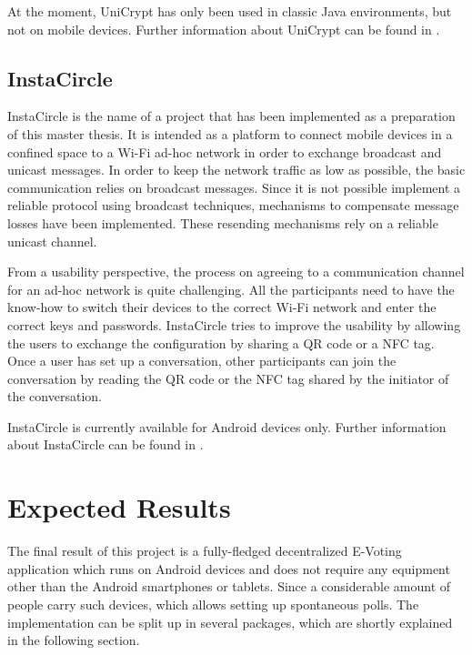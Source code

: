\documentclass[numbers=noenddot, abstract=on]{scrreprt}
\begin{document}
At the moment, UniCrypt has only been used in classic Java environments, but not
on mobile devices. Further information about UniCrypt can be found in
\cite{ritter12}.

\section{InstaCircle}
\label{sec:instacircle}
InstaCircle is the name of a project that has been implemented as a preparation
of this master thesis. It is intended as a platform to connect mobile devices
in a confined space to a Wi-Fi ad-hoc network in order to exchange broadcast
and unicast messages. In order to keep the network traffic as low as possible,
the basic communication relies on broadcast messages. Since it is not possible
implement a reliable protocol using broadcast techniques, mechanisms to
compensate message losses have been implemented. These resending mechanisms rely
on a reliable unicast channel.

From a usability perspective, the process on agreeing to a communication channel
for an ad-hoc network is quite challenging. All the participants need to have
the know-how to switch their devices to the correct Wi-Fi network and enter the
correct keys and passwords. InstaCircle tries to improve the usability by
allowing the users to exchange the configuration by sharing a QR code or a NFC
tag. Once a user has set up a conversation, other participants can join the
conversation by reading the QR code or the NFC tag shared by the initiator of
the conversation.

InstaCircle is currently available for Android devices only. Further information
about InstaCircle can be found in \cite{ritter13a}.

\chapter{Expected Results}
\label{cha:expectedresults}
The final result of this project is a fully-fledged decentralized E-Voting
application which runs on Android devices and does not require any equipment
other than the Android smartphones or tablets. Since a considerable amount of
people carry such devices, which allows setting up spontaneous polls. The
implementation can be split up in several packages, which are shortly explained
in the following section.
\end{document}

